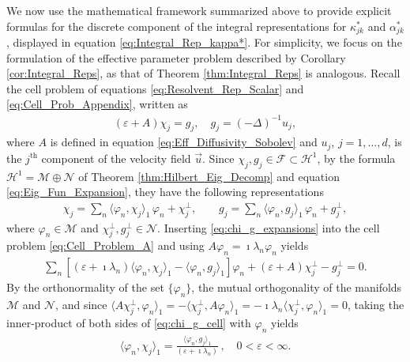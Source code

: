 \documentclass[11pt]{amsart}
\newcommand{\Hc}{\mathcal{H}}
\newcommand{\Fc}{\mathcal{F}}
\renewcommand{\Mc}{\mathcal{M}}
\newcommand{\Nc}{\mathcal{N}}
\begin{document}
We now use the mathematical framework summarized above to provide
explicit formulas for the discrete component of the integral
representations for $\kappa^*_{jk}$ and $\alpha^*_{jk}$, displayed in equation
\eqref{eq:Integral_Rep_kappa*}. For simplicity, we focus on the
formulation of the effective parameter problem described by Corollary
\ref{cor:Integral_Reps}, as that of Theorem \ref{thm:Integral_Reps} is
analogous. Recall the cell problem of equations
\eqref{eq:Resolvent_Rep_Scalar} and \eqref{eq:Cell_Prob_Appendix}, 
written as 
% 
\begin{align}\label{eq:Cell_Problem_A}
  (\varepsilon+A)\chi_j=g_j, \quad g_j=(-\Delta)^{-1}u_j,
\end{align}
%
where $A$ is defined in equation \eqref{eq:Eff_Diffusivity_Sobolev} 
and $u_j$, $j=1,\ldots,d$, is the $j^{\text{th}}$ component of the velocity field
$\vec{u}$. Since $\chi_j,g_j\in\Fc\subset\Hc^1$, by the formula
$\Hc^1=\Mc\oplus\Nc$ of Theorem \ref{thm:Hilbert_Eig_Decomp} and equation
\eqref{eq:Eig_Fun_Expansion}, they have the following representations    
%
\begin{align}\label{eq:chi_g_expansions}
  \chi_j=\sum_n\langle\varphi_n,\chi_j\rangle_1\,\varphi_n +\chi_j^\perp, \qquad  g_j=\sum_n\langle\varphi_n,g_j\rangle_1\,\varphi_n +g_j^\perp,
\end{align}
%
where $\varphi_n\in\Mc$ and $\chi_j^\perp,g_j^\perp\in\Nc$. Inserting
\eqref{eq:chi_g_expansions} into the cell problem
\eqref{eq:Cell_Problem_A} and using $A\varphi_n=\imath\lambda_n\varphi_n$ yields
%
\begin{align}\label{eq:chi_g_cell}
  \sum_n[(\varepsilon+\imath\lambda_n)\langle\varphi_n,\chi_j\rangle_1-\langle\varphi_n,g_j\rangle_1]\varphi_n+(\varepsilon+A)\chi_j^\perp-g_j^\perp=0.
\end{align}
%
By the orthonormality of the set $\{\varphi_n\}$, the mutual orthogonality of
the manifolds $\Mc$ and $\Nc$, and since
$\langle A\chi_j^\perp,\varphi_n\rangle_1=-\langle\chi_j^\perp,A\varphi_n\rangle_1=-\imath\lambda_n\langle\chi_j^\perp,\varphi_n\rangle_1=0$, taking the
inner-product of both sides of \eqref{eq:chi_g_cell} with $\varphi_n$ yields   
%
\begin{align}\label{eq:Coefficients}
  \langle\varphi_n,\chi_j\rangle_1=\frac{\langle\varphi_n,g_j\rangle_1}{(\varepsilon+\imath\lambda_n)}\,, \quad
  0<\varepsilon<\infty.
\end{align}
%
\end{document}

